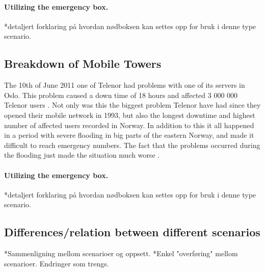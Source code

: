 \paragraph{Utilizing the emergency box.}
*detaljert forklaring på hvordan nødboksen kan settes opp for bruk i denne type scenario. 

\subsection{Breakdown of Mobile Towers}

The 10th of June 2011 one of Telenor had problems with one of its servers in Oslo. This problem caused a down time of 18 hours and affected 3 000 000 Telenor users \cite{listeNedetid}. Not only was this the biggest problem Telenor have had since they opened their mobile network in 1993, but also the longest downtime and highest number of affected users recorded in Norway. In addition to this it all happened in a period with severe flooding in big parts of the eastern Norway, and made it difficult to reach emergency numbers. The fact that the problems occurred during the flooding just made the situation much worse \cite{TelenorNede}.

\paragraph{Utilizing the emergency box.}
*detaljert forklaring på hvordan nødboksen kan settes opp for bruk i denne type scenario. 


\subsection{Differences/relation between different scenarios}
*Sammenligning mellom scenarioer og oppsett. 
*Enkel "overføring" mellom scenarioer. Endringer som trengs. 





